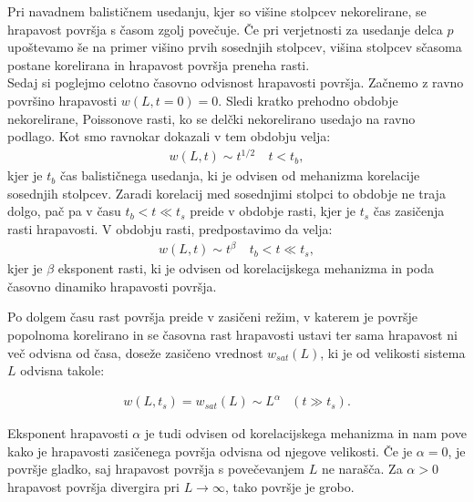 \documentclass[a4paper, twoside, 12pt]{book}
\begin{document}
Pri navadnem balističnem usedanju, kjer so višine stolpcev nekorelirane, se hrapavost površja s časom zgolj povečuje. Če pri verjetnosti za usedanje delca $p$ upoštevamo še na primer višino prvih sosednjih stolpcev, višina stolpcev sčasoma postane korelirana in hrapavost površja preneha rasti. \\
Sedaj si poglejmo celotno časovno odvisnost hrapavosti površja. Začnemo z ravno površino hrapavosti $w(L,t=0)=0$. Sledi kratko prehodno obdobje nekorelirane, Poissonove rasti, ko se delčki nekorelirano usedajo na ravno podlago. Kot smo ravnokar dokazali v tem obdobju velja:
\begin{equation}
  \begin{array}{lr} w(L,t) \sim t^{1/2} & \ t < t_b, \end{array}
\end{equation}
kjer je $t_b$ čas balističnega usedanja, ki je odvisen od mehanizma korelacije sosednjih stolpcev.
Zaradi korelacij med sosednjimi stolpci to obdobje ne traja dolgo, pač pa v času $t_b < t \ll t_s$ preide v obdobje rasti, kjer je $t_s$ čas zasičenja rasti hrapavosti. V obdobju rasti, predpostavimo da velja:
  \begin{equation}
    \begin{array}{lr} w(L,t) \sim t^\beta  & \ t_b < t \ll t_s, \end{array}
    \label{beta}
  \end{equation}
kjer je $\beta$ eksponent rasti, ki je odvisen od korelacijskega mehanizma in poda časovno dinamiko hrapavosti površja.

Po dolgem času rast površja preide v zasičeni režim, v katerem je površje popolnoma korelirano in se časovna rast hrapavosti ustavi ter sama hrapavost ni več odvisna od časa, doseže zasičeno vrednost $w_{sat}(L)$, ki je od velikosti sistema $L$ odvisna takole:

  \begin{equation}
    \begin{array}{lr} w(L,t_s) = w_{sat}(L) \sim L^\alpha & (t \gg t_s). \end{array}
    \label{alfa}
  \end{equation}

Eksponent hrapavosti $\alpha$ je tudi odvisen od korelacijskega mehanizma in nam pove kako je hrapavosti zasičenega površja odvisna od njegove velikosti. Če je $\alpha = 0$, je površje gladko, saj hrapavost površja s povečevanjem $L$ ne narašča. Za $\alpha > 0$ hrapavost površja divergira pri $L \rightarrow \infty$, tako površje je grobo. \cite{krim1993roughness}
\end{document}
